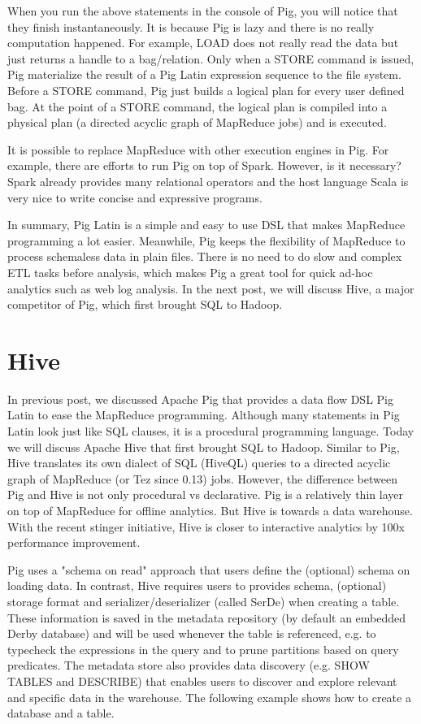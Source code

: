 \documentclass[11pt]{book}
\begin{document}
When you run the above statements in the console of Pig, you will notice that they finish instantaneously. It is because Pig is lazy and there is no really computation happened. For example, LOAD does not really read the data but just returns a handle to a bag/relation. Only when a STORE command is issued, Pig materialize the result of a Pig Latin expression sequence to the file system. Before a STORE command, Pig just builds a logical plan for every user defined bag. At the point of a STORE command, the logical plan is compiled into a physical plan (a directed acyclic graph of MapReduce jobs) and is executed.

It is possible to replace MapReduce with other execution engines in Pig. For example, there are efforts to run Pig on top of Spark. However, is it necessary? Spark already provides many relational operators and the host language Scala is very nice to write concise and expressive programs.

In summary, Pig Latin is a simple and easy to use DSL that makes MapReduce programming a lot easier. Meanwhile, Pig keeps the flexibility of MapReduce to process schemaless data in plain files. There is no need to do slow and complex ETL tasks before analysis, which makes Pig a great tool for quick ad-hoc analytics such as web log analysis. In the next post, we will discuss Hive, a major competitor of Pig, which first brought SQL to Hadoop.

\section{Hive}
In previous post, we discussed Apache Pig that provides a data flow DSL Pig Latin to ease the MapReduce programming. Although many statements in Pig Latin look just like SQL clauses, it is a procedural programming language. Today we will discuss Apache Hive that first brought SQL to Hadoop. Similar to Pig, Hive translates its own dialect of SQL (HiveQL) queries to a directed acyclic graph of MapReduce (or Tez since 0.13) jobs. However, the difference between Pig and Hive is not only procedural vs declarative. Pig is a relatively thin layer on top of MapReduce for offline analytics. But Hive is towards a data warehouse. With the recent stinger initiative, Hive is closer to interactive analytics by 100x performance improvement.

Pig uses a "schema on read" approach that users define the (optional) schema on loading data. In contrast, Hive requires users to provides schema, (optional) storage format and serializer/deserializer (called SerDe) when creating a table. These information is saved in the metadata repository (by default an embedded Derby database) and will be used whenever the table is referenced, e.g. to typecheck the expressions in the query and to prune partitions based on query predicates. The metadata store also provides data discovery (e.g. SHOW TABLES and DESCRIBE) that enables users to discover and explore relevant and specific data in the warehouse. The following example shows how to create a database and a table.
\end{document}
